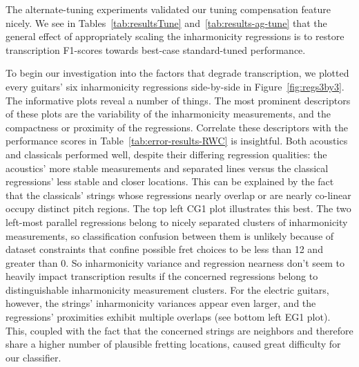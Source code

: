 \documentclass[12pt]{cmuthesis}
\begin{document}
The alternate-tuning experiments validated our tuning compensation feature nicely. We see in Tables~\ref{tab:resultsTune} and~\ref{tab:results-ag-tune} that the general effect of appropriately scaling the inharmonicity regressions is to restore transcription F1-scores towards best-case standard-tuned performance.


To begin our investigation into the factors that degrade transcription, we plotted every guitars' six inharmonicity regressions side-by-side in Figure~\ref{fig:regs3by3}. The informative plots reveal a number of things. The most prominent descriptors of these plots are the variability of the inharmonicity measurements, and the compactness or proximity of the regressions. Correlate these descriptors with the performance scores in Table~\ref{tab:error-results-RWC} is insightful. Both acoustics and classicals performed well, despite their differing regression qualities: the acoustics' more stable measurements and separated lines versus the classical regressions' less stable and closer locations. This can be explained by the fact that the classicals' strings whose regressions nearly overlap or are nearly co-linear occupy distinct pitch regions. The top left CG1 plot illustrates this best. The two left-most parallel regressions belong to nicely separated clusters of inharmonicity measurements, so classification confusion between them is unlikely because of dataset constraints that confine possible fret choices to be less than 12 and greater than 0. So inharmonicity variance and regression nearness don't seem to heavily impact transcription results if the concerned regressions belong to distinguishable inharmonicity measurement clusters. For the electric guitars, however, the strings' inharmonicity variances appear even larger, and the regressions' proximities exhibit multiple overlaps (see bottom left EG1 plot). This, coupled with the fact that the concerned strings are neighbors and therefore share a higher number of plausible fretting locations, caused great difficulty for our classifier.
\end{document}
